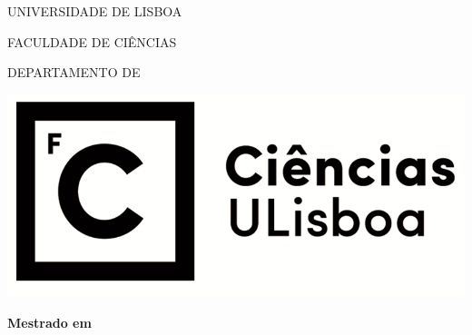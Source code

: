 \thispagestyle{empty}


{\coverfont

\begin{center}

{\large 
UNIVERSIDADE DE LISBOA
\vspace{8.0pt}

FACULDADE DE CIÊNCIAS
\vspace{8.0pt}

DEPARTAMENTO DE \departmentname
\vspace{8.0pt}
}

\vspace{46pt}

\includegraphics{assets/logo.png}

\vspace{117pt}

{\fontsize{17}{19.55}\coverfont\textbf{\thesisname}}

\vspace{110pt}

{\fontsize{15}{17.25}\coverfont\studentname}

\vspace{74pt}

{\fontsize{13}{14.95}\coverfont\textbf{Mestrado em {\coursename}}

}
\end{center}}
